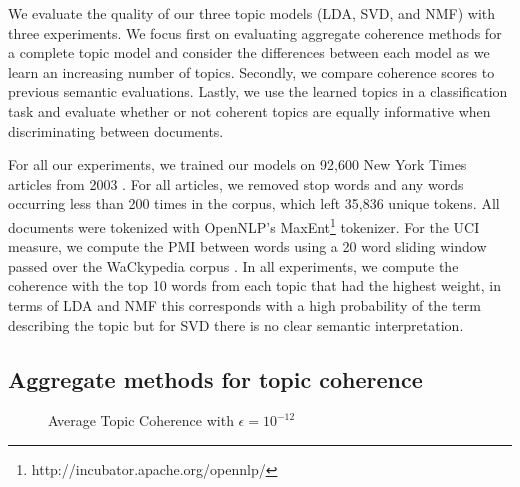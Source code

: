 \label{sec:evaluation}
We evaluate the quality of our three topic models (LDA, SVD, and NMF) with three
experiments.  We focus first on evaluating aggregate coherence methods for a complete
topic model and consider the differences between each model as we learn an
increasing number of topics.  Secondly, we compare coherence scores to previous
semantic evaluations.  Lastly, we use the learned topics in a classification
task and evaluate whether or not coherent topics are equally informative when
discriminating between documents.

For all our experiments, we trained our models on 92,600 New York Times articles
from 2003 \cite{nytcorpus}.  For all articles, we removed stop words and any
words occurring less than 200 times in the corpus, which left 35,836 unique
tokens.  All documents were tokenized with OpenNLP's
MaxEnt\footnote{http://incubator.apache.org/opennlp/} tokenizer.  For the UCI
measure, we compute the PMI between words using a 20 word sliding window passed
over the WaCkypedia corpus \cite{baroni09wacky}.  In all experiments, we compute
the coherence with the top 10 words from each topic that had the highest weight,
in terms of LDA and NMF this corresponds with a high probability of the term
describing the topic but for SVD there is no clear semantic interpretation.

\subsection{Aggregate methods for topic coherence}

\begin{figure}[h!t!b!]
  \centering
  \caption{Average Topic Coherence with $\epsilon=10^{-12}$}
  \label{fig:mean-smoothing}
\end{figure}

